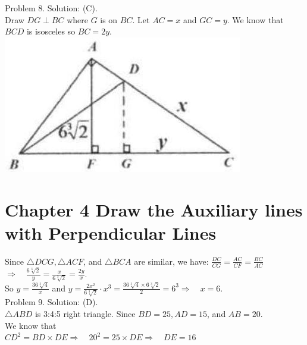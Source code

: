 \documentclass[10pt]{article}
\begin{document}
Problem 8. Solution: (C).\\
Draw \(D G \perp B C\) where \(G\) is on \(B C\). Let \(A C=x\) and \(G C=y\). We know that \(B C D\) is isosceles so \(B C=2 y\).\\
\includegraphics[max width=\textwidth, center]{2025_04_17_97bc1f7e44d93c271a88g-094(1)}

\section*{Chapter 4 Draw the Auxiliary lines with Perpendicular Lines}
Since \(\triangle D C G, \triangle A C F\), and \(\triangle B C A\) are similar, we have: \(\frac{D C}{C G}=\frac{A C}{C F}=\frac{B C}{A C}\)\\
\(\Rightarrow \quad \frac{6 \sqrt[3]{2}}{y}=\frac{x}{6 \sqrt[3]{2}}=\frac{2 y}{x}\).\\
So \(y=\frac{36 \sqrt[3]{4}}{x}\) and \(y=\frac{2 x^{2}}{6 \sqrt[3]{2}} \cdot x^{3}=\frac{36 \sqrt[3]{4} \times 6 \sqrt[3]{2}}{2}=6^{3} \Rightarrow \quad x=6\).\\
Problem 9. Solution: (D).\\
\(\triangle A B D\) is 3:4:5 right triangle. Since \(B D=25, A D=15\), and \(A B=20\).\\
We know that\\
\(C D^{2}=B D \times D E \Rightarrow \quad 20^{2}=25 \times D E \Rightarrow \quad D E=16\)
\end{document}
